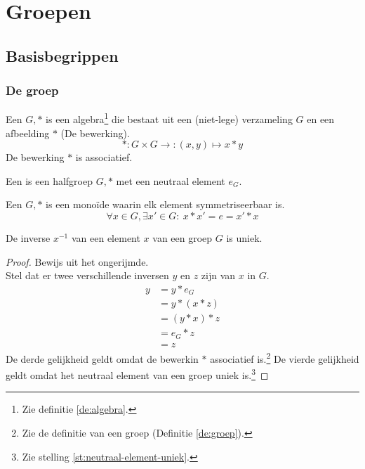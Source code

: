 \documentclass[main.tex]{subfiles}
\begin{document}
\chapter{Groepen}
\label{cha:groepen}

\section{Basisbegrippen}
\label{sec:basisbegrippen}

\subsection{De groep}
\label{sec:de-groep}

\begin{de}
  Een  $G,*$ is een algebra\footnote{Zie definitie \ref{de:algebra}.} die bestaat uit een (niet-lege) verzameling $G$ en een afbeelding $*$ (De bewerking).
  \[ *: G \times G \rightarrow: (x,y) \mapsto x * y \]
  De bewerking $*$ is associatief.
\end{de}

\begin{de}
  Een  is een halfgroep $G,*$ met een neutraal element $e_{G}$.
\end{de}


\begin{de}
  \label{de:groep}
  Een  $G,*$ is een mono\"ide waarin elk element symmetriseerbaar is.
  \[ \forall x \in G, \exists x' \in G:\ x * x' = e = x' * x \]
\end{de}

\begin{st}
  \label{st:groep-uniek-invers-element}
  De inverse $x^{-1}$ van een element $x$ van een groep $G$ is uniek.
  
  \begin{proof}
    Bewijs uit het ongerijmde.\\
    Stel dat er twee verschillende inversen $y$ en $z$ zijn van $x$ in $G$.
    \[  
    \begin{array}{rl}
      y &= y * e_{G}\\
        &= y * (x * z)\\
        &= (y * x) * z\\
        &= e_{G} * z\\
        &= z
    \end{array}
    \]
    De derde gelijkheid geldt omdat de bewerkin $*$ associatief is.\footnote{Zie de definitie van een groep (Definitie \ref{de:groep}).} De vierde gelijkheid geldt omdat het neutraal element van een groep uniek is.\footnote{Zie stelling \ref{st:neutraal-element-uniek}.}
  \end{proof}
\end{st}
\end{document}
